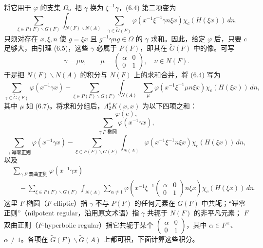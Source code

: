 将它用于 $\varphi$ 的支集 $\Omega$。把 $\gamma$ 换为 $\xi^{-1}\gamma$，(6.4) 第二项变为
\begin{equation}
 \sum_{\xi\in P(F)\backslash G(F)}\int_{N(F)\backslash N(A)}
 \sum_{\gamma\in\widetilde G(F)}\varphi(x^{-1}\xi^{-1}\gamma n\xi x)
 \chi_c(H(\xi x))\,dn.\tag{6.6}
\end{equation}
只须对存在 $x,\xi,n$ 使 $g=\xi x$ 且 $g^{-1}\gamma ng\in\Omega$ 的 $\gamma$ 求和。因此，给定
$\varphi$ 后，只要 $c$ 足够大，由引理 (6.5)，这些 $\gamma$ 必属于 $P(F)$，即其在
$\widetilde G(F)$ 中的像。可写
\begin{equation}
 \gamma=\mu\nu,\qquad\mu=\begin{pmatrix}\alpha&0\\0&1\end{pmatrix},\quad\nu\in N(F).\tag{6.7}
\end{equation}
于是把 $N(F)\backslash N(A)$ 的积分与 $N(F)$ 上的求和合并，将 (6.4) 写为
\begin{equation}
 \sum_{\gamma\in\widetilde G(F)}\varphi(x^{-1}\gamma x)
 -\sum_{\xi\in P(F)\backslash G(F)}\int_{N(A)}\sum_\mu
 \varphi(x^{-1}\xi^{-1}\mu n\xi x)\chi_c(H(\xi x))\,dn,\tag{6.8}
\end{equation}
其中 $\mu$ 如 (6.7)。将求和分组后，$\Lambda_2^cK(x,x)$ 为以下四项之和：
\begin{equation}
 \varphi(e),\tag{6.9}
\end{equation}
\begin{equation}
 \sum_{\gamma\ F\text{ 椭圆}}\varphi(x^{-1}\gamma x),\tag{6.10}
\end{equation}
\begin{equation}
 \sum_{\gamma\text{ 幂零正则}}\varphi(x^{-1}\gamma x)
 -\sum_{\xi\in P(F)\backslash G(F)}\int_{N(A)}
 \varphi(x^{-1}\xi^{-1}n\xi x)\chi_c(H(\xi x))\,dn,\tag{6.11}
\end{equation}
以及
\begin{equation}
\begin{split}
 &\sum_{\gamma\ F\text{ 双曲正则}}\varphi(x^{-1}\gamma x)\\
 &\quad-\sum_{\xi\in P(F)\backslash G(F)}\int_{N(A)}\sum_{\alpha\ne1}
 \varphi\!\left(x^{-1}\xi^{-1}\begin{pmatrix}\alpha&0\\0&1\end{pmatrix}n\xi x\right)
 \chi_c(H(\xi x))\,dn.
\end{split}\tag{6.12}
\end{equation}
这里 $F$ 椭圆（$F$-elliptic）指 $\gamma$ 不与 $P(F)$ 的任何元素在 $G(F)$ 中共轭；“幂零正则”（nilpotent regular，沿用原文术语）指 $\gamma$ 共轭于 $N(F)$ 的非平凡元素；
$F$ 双曲正则（$F$-hyperbolic regular）指它共轭于某个
$\left(\begin{smallmatrix}\alpha&0\\0&1\end{smallmatrix}\right)$，其中 $\alpha\in F^\times$、$\alpha\ne1$。各项在
$\widetilde G(F)\backslash\widetilde G(A)$ 上都可积，下面计算这些积分。

